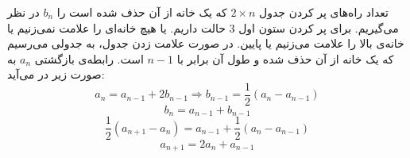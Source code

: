 \p
تعداد راه‌های پر کردن جدول
$2 \times n$
که یک خانه از آن حذف شده است را
$b_n$
در نظر می‌گیریم. برای پر کردن ستون اول
$3$
حالت داریم. یا هیچ خانه‌ای را علامت نمی‌زنیم یا خانه‌ی بالا را علامت می‌زنیم یا پایین. در صورت علامت زدن جدول، به جدولی می‌رسیم که یک خانه از آن حذف شده و طول آن برابر با
$n - 1$
است. رابطه‌ی بازگشتی
$a_n$
به صورت زیر در می‌آید:
$$a_n = a_{n-1} + 2b_{n-1} \Rightarrow b_{n-1} = \frac{1}{2}(a_n - a_{n-1})$$
$$b_n = a_{n-1} + b_{n-1}$$
$$\frac{1}{2}(a_{n+1} - a_n) = a_{n-1} + \frac{1}{2}(a_n - a_{n-1})$$
$$a_{n+1} = 2a_n + a_{n-1}$$